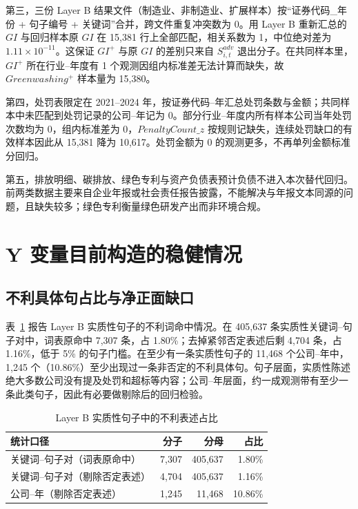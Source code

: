 \documentclass[12pt,a4paper]{article}
\begin{document}
第三，三份 Layer B 结果文件（制造业、非制造业、扩展样本）按``证券代码\_年份 + 句子编号 + 关键词''合并，跨文件重复冲突数为 0。用 Layer B 重新汇总的 $GI$ 与回归样本原 $GI$ 在 15,381 行上全部匹配，相关系数为 1，中位绝对差为 $1.11\times 10^{-11}$。这保证 $GI^+$ 与原 $GI$ 的差别只来自 $S^{adv}_{i,t}$ 退出分子。在共同样本里，$GI^+$ 所在行业--年度有 1 个观测因组内标准差无法计算而缺失，故 $Greenwashing^+$ 样本量为 15,380。

第四，处罚表限定在 2021--2024 年，按证券代码--年汇总处罚条数与金额；共同样本中未匹配到处罚记录的公司--年记为 0。部分行业--年度内所有样本公司当年处罚次数均为 0，组内标准差为 0，$PenaltyCount\_z$ 按规则记缺失，连续处罚缺口的有效样本因此从 15,381 降为 10,617。处罚金额为 0 的观测更多，不再单列金额标准分回归。

第五，排放明细、碳排放、绿色专利与资产负债表预计负债不进入本次替代回归。前两类数据主要来自企业年报或社会责任报告披露，不能解决与年报文本同源的问题，且缺失较多；绿色专利衡量绿色研发产出而非环境合规。

\section{Y 变量目前构造的稳健情况}

\subsection{不利具体句占比与净正面缺口}

表~\ref{tab:adverse_share} 报告 Layer B 实质性句子的不利词命中情况。在 405,637 条实质性关键词--句子对中，词表原命中 7,307 条，占 1.80\%；去掉紧邻否定表述后剩 4,704 条，占 1.16\%，低于 5\% 的句子门槛。在至少有一条实质性句子的 11,468 个公司--年中，1,245 个（10.86\%）至少出现过一条非否定的不利具体句。句子层面，实质性陈述绝大多数公司没有提及处罚和超标等内容；公司--年层面，约一成观测带有至少一条此类句子，因此有必要做剔除后的回归检验。

\begin{table}[htbp]
\centering
\caption{Layer B 实质性句子中的不利表述占比}
\label{tab:adverse_share}
\begin{tabular}{lrrr}
\toprule
统计口径 & 分子 & 分母 & 占比 \\
\midrule
关键词--句子对（词表原命中） & 7,307 & 405,637 & 1.80\% \\
关键词--句子对（剔除否定表述） & 4,704 & 405,637 & 1.16\% \\
公司--年（剔除否定表述） & 1,245 & 11,468 & 10.86\% \\
\bottomrule
\end{tabular}
\end{table}
\end{document}
